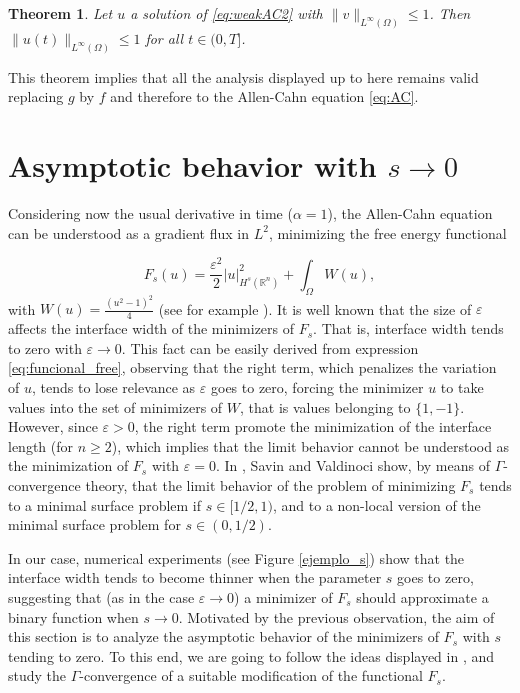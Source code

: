 \documentclass{amsart}
\newcommand{\rn}{{\mathbb{R}^n}}
\newcommand{\e}{\varepsilon}
\newcommand{\W}{\Omega}
\newcommand{\eps}{\varepsilon}
\newcommand{\fmonio}{g}
\newtheorem{theorem}{Theorem}[section]
\theoremstyle{remark}
\theoremstyle{definition}
\numberwithin{equation}{section}
\begin{document}
\begin{theorem}
Let $u$ a solution of \eqref{eq:weakAC2} with $\|v\|_{L^{\infty}(\W)} \leq 1$. Then $\|u(t)\|_{L^{\infty}(\W)} \leq 1$ for all $t \in (0,T]$.  
\end{theorem}

This theorem implies that all the analysis displayed up to here remains valid replacing $\fmonio$ by $f$ and therefore to the Allen-Cahn equation \eqref{eq:AC}.   

         
	
	



\section{Asymptotic behavior with $s \rightarrow 0$} 
\label{sec:asymptotic}


Considering now the usual derivative in time ($\alpha = 1$), the Allen-Cahn equation can be understood as a gradient flux in $L^2$, minimizing the free energy functional   

\begin{equation}
F_s(u) = \frac{\e^2}{2}|u|^2_{H^s(\rn)} + \int_{\Omega} W(u),
\label{eq:funcional_free}
\end{equation} 
with $W(u) = \frac{(u^2 - 1)^2}{4}$ (see for example \cite{ains}). 
It is well known that the size of $\eps$ affects the interface width of the minimizers of $F_s$. That is, interface width tends to zero with $\eps \to 0$. This fact can be easily derived from expression \eqref{eq:funcional_free}, observing that the right term, which penalizes the variation of $u$, tends to lose relevance as $\eps$ goes to zero, forcing the minimizer $u$ to take values into the set of minimizers of $W$, that is values belonging to $\{1 , -1 \}$. However, since $\eps > 0$, the right term promote the minimization of the interface length (for $n \geq 2$), which implies that the limit behavior cannot be understood as the minimization of $F_s$ with $\eps = 0$. In \cite{SV}, Savin and Valdinoci show, by means of $\Gamma$-convergence theory, that the limit behavior of the problem of minimizing  $F_s$ tends to a minimal surface problem if $s \in [1/2,1)$, and to a non-local version of the minimal surface problem for $s \in (0,1/2)$.         
            

In our case, numerical experiments (see Figure \ref{ejemplo_s}) show that the interface width tends to become thinner when the parameter $s$ goes to zero, suggesting that (as in the case $\eps \to 0$) a minimizer of $F_s$ should approximate a binary function when $s \to 0$. Motivated by the previous observation, the aim of this section is to analyze the asymptotic behavior of the minimizers of $F_s$ with $s$ tending to zero. To this end, we are going to follow the ideas displayed in \cite{SV}, and study the $\Gamma$-convergence of a suitable modification of the functional $F_s$. 
\end{document}
